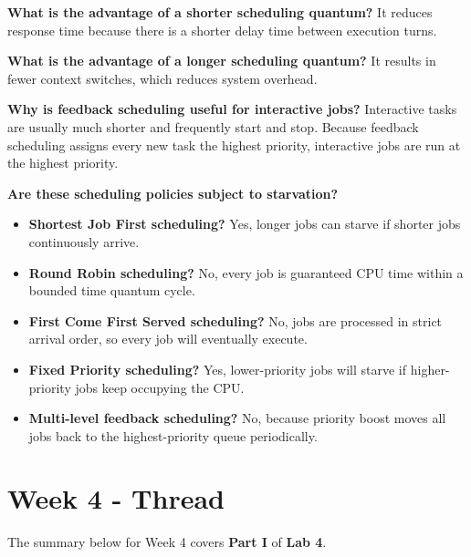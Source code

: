 \documentclass[11pt,a4paper]{article}
\begin{document}
\vspace{0.3em}
\noindent \textbf{What is the advantage of a shorter scheduling quantum?} 
It reduces response time because there is a shorter delay time between execution turns.

\hspace{5pt}

\vspace{0.3em}
\noindent \textbf{What is the advantage of a longer scheduling quantum?} 
It results in fewer context switches, which reduces system overhead.

\hspace{5pt}

\vspace{0.3em}
\noindent \textbf{Why is feedback scheduling useful for interactive jobs?} 
Interactive tasks are usually much shorter and frequently start and stop. Because feedback scheduling assigns every new task the highest priority, interactive jobs are run at the highest priority.

\hspace{5pt}

\vspace{0.3em}
\noindent \textbf{Are these scheduling policies subject to starvation?} 

\begin{itemize}
    \item \textbf{Shortest Job First scheduling?} Yes, longer jobs can starve if shorter jobs continuously arrive.
    \item \textbf{Round Robin scheduling?} No, every job is guaranteed CPU time within a bounded time quantum cycle.
    \item \textbf{First Come First Served scheduling?} No, jobs are processed in strict arrival order, so every job will eventually execute.
    \item \textbf{Fixed Priority scheduling?} Yes, lower-priority jobs will starve if higher-priority jobs keep occupying the CPU.
    \item \textbf{Multi-level feedback scheduling?} No, because priority boost moves all jobs back to the highest-priority queue periodically.
\end{itemize}

\section{Week 4 - Thread}

The summary below for Week 4 covers \textbf{Part I} of \textbf{Lab 4}.
\end{document}
